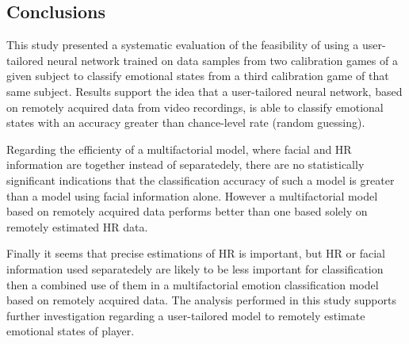 
\subsection{Conclusions}

This study presented a systematic evaluation of the feasibility of using a user-tailored neural network trained on data samples from two calibration games of a given subject to classify emotional states from a third calibration game of that same subject. Results support the idea that a user-tailored neural network, based on remotely acquired data from video recordings, is able to classify emotional states with an accuracy greater than chance-level rate (random guessing).

Regarding the efficienty of a multifactorial model, where facial and HR information are together instead of separatedely, there are no statistically significant indications that the classification accuracy of such a model is greater than a model using facial information alone. However a multifactorial model based on remotely acquired data performs better than one based solely on remotely estimated HR data.

Finally it seems that precise estimations of HR is important, but HR or facial information used separatedely are likely to be less important for classification then a combined use of them in a multifactorial emotion classification model based on remotely acquired data. The analysis performed in this study supports further investigation regarding a user-tailored model to remotely estimate emotional states of player.
